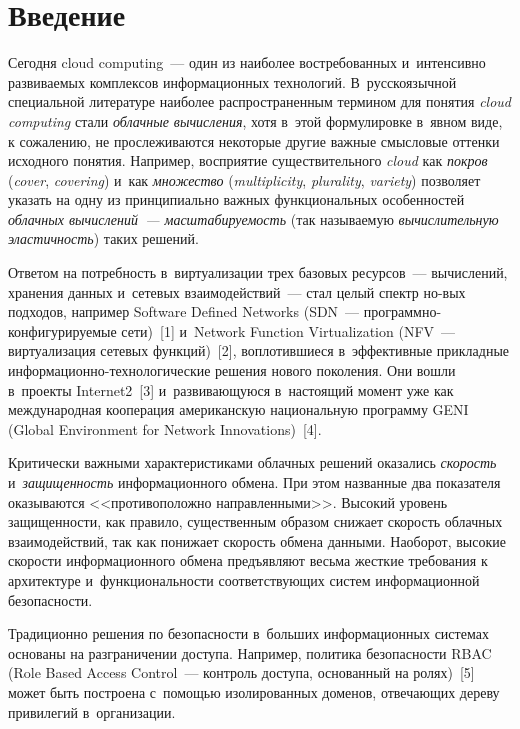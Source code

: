 \begin{multicols}{2}

\label{st\stat}
     
\section{Введение}

  Сегодня cloud computing~--- один из наиболее востребованных и~интенсивно 
развиваемых комплексов информационных технологий. В~русскоязычной 
специальной литературе наиболее распространенным термином для понятия 
\textit{cloud computing} стали \textit{облачные вычисления}, хотя в~этой 
формулировке в~явном виде, к сожалению, не прослеживаются некоторые 
другие важные смысловые оттенки исходного понятия. Например, восприятие 
существительного \textit{cloud} как \textit{покров} (\textit{cover}, 
\textit{covering}) и~как \textit{множество} (\textit{multiplicity}, \textit{plurality}, 
\textit{variety}) позволяет указать на одну из принципиально важных 
функциональных особенностей \textit{облачных вычислений~--- 
масштабируемость} (так называемую \textit{вычислительную эластичность}) 
таких решений. 
  
  Ответом на потребность в~виртуализации трех базовых ресурсов~--- 
вычислений, хранения данных и~сетевых взаимодействий~--- стал целый спектр 
но-\linebreak вых подходов, например Software Defined Networks (SDN~--- 
про\-граммно-кон\-фи\-гу\-ри\-ру\-емые сети)~[1] и~Network Function 
Virtualization (NFV~--- виртуализация сетевых функций)~[2], во\-пло\-тив\-ши\-еся 
в~эффективные прикладные ин\-фор\-ма\-ци\-он\-но-тех\-но\-ло\-ги\-че\-ские решения 
нового поколения. Они вошли в~проекты Internet2~[3] и~раз\-ви\-ва\-ющу\-юся 
в~настоящий момент уже как международная кооперация американскую 
национальную программу GENI (Global Environment for Network 
Innovations)~[4]. 
  
  Критически важными характеристиками облачных решений оказались 
\textit{скорость} и~\textit{защищенность} информационного обмена. При этом 
названные два показателя оказываются <<противоположно направленными>>. 
Высокий уровень защищенности, как правило, существенным образом снижает 
скорость облачных взаимодействий, так как  понижает скорость обмена 
данными. Наоборот, высокие скорости информационного обмена предъявляют 
весьма жесткие требования к архитектуре и~функциональности 
соответствующих систем информационной безопасности. 
  
  Традиционно решения по безопасности в~больших информационных 
системах основаны на разграничении доступа. Например, политика 
безопасности RBAC (Role Based Access Control~--- контроль доступа, 
основанный на ролях)~[5] может быть построена с~по\-мощью 
изолированных доменов, отвечающих дереву привилегий в~организации.
  

\end{multicols}
